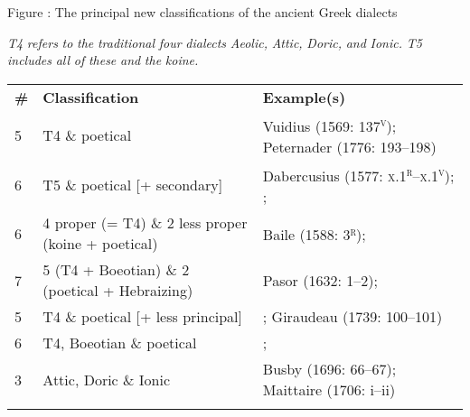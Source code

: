 \documentclass[output=paper]{langsci/langscibook}
\begin{document}
\begin{stylecaption}
Figure : The principal new classifications of the ancient Greek dialects
\end{stylecaption}

\textit{T4} \textit{refers} \textit{to} \textit{the} \textit{traditional} \textit{four} \textit{dialects} \textit{Aeolic,} \textit{Attic,} \textit{Doric,} \textit{and} \textit{Ionic.} \textit{T5} \textit{includes} \textit{all} \textit{of} \textit{these} \textit{and} \textit{the} \textit{koine.}

\tablefirsthead{}

\tabletail{}
\tablelasttail{}
\begin{tabularx}{\textwidth}{XXX}
\lsptoprule

 \textbf{\#} & \textbf{Classification} & \textbf{Example(s)}\\
 5 & T4 \& poetical & Vuidius (1569: 137\textsc{\textsuperscript{v}}); Peternader (1776: 193–198)\\
 6 & T5 \& poetical [+ secondary] & Dabercusius (1577: \textsc{x.1}\textsc{\textsuperscript{r}}\textsc{–x.1}\textsc{\textsuperscript{v}}); \citet[334]{Alsted1630}; \citet[64]{Bregius1684}\\
 6 & 4 proper (= T4) \& 2 less proper (koine + poetical) & Baile (1588: 3\textsc{\textsuperscript{r}}); \citet[4]{Schmidt1604}\\
 7 & 5 (T4 + Boeotian) \& 2 (poetical + Hebraizing) & Pasor (1632: 1–2); \citet[3]{Wyss1650}\\
 5 & T4 \& poetical [+ less principal] & \citet[302]{Opitz1687}; Giraudeau (1739: 100–101)\\
 6 & T4, Boeotian \& poetical & \citet[48]{Wright1691}; \citet[121]{Holmes1735}\\
 3 & Attic, Doric \& Ionic & Busby (1696: 66–67); Maittaire (1706: i–ii)\\
\lspbottomrule
\end{tabularx}
\end{document}
